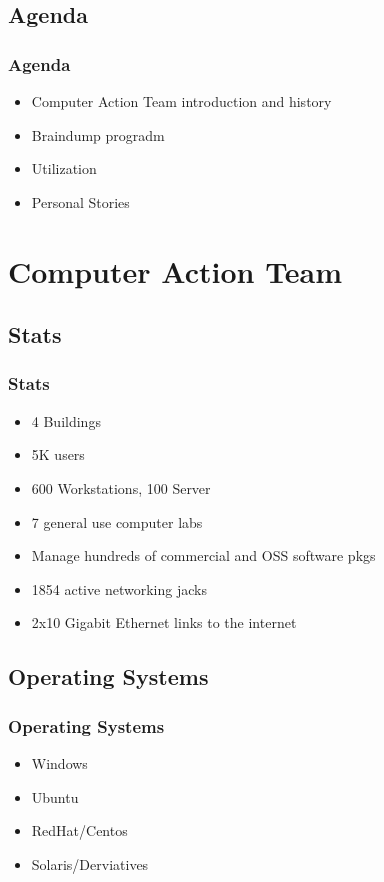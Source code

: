 \documentclass{beamer}
\begin{document}
\subsection{Agenda}
\frame
{
    \frametitle{Agenda}
    \begin{itemize}
        \item Computer Action Team introduction and history
        \item Braindump progradm
        \item Utilization
        \item Personal Stories
    \end{itemize}
}

\section{Computer Action Team}
\subsection{Stats}
\frame
{
    \frametitle{Stats}
    \begin{itemize}
        \item 4 Buildings
        \item 5K users
        \item 600 Workstations, 100 Server
        \item 7 general use computer labs
        \item Manage hundreds of commercial and OSS software pkgs
        \item 1854 active networking jacks
        \item 2x10 Gigabit Ethernet links to the internet
    \end{itemize}

}

\subsection{Operating Systems}
\frame
{
    \frametitle{Operating Systems}
    \begin{itemize}
        \item Windows
        \item Ubuntu
        \item RedHat/Centos
        \item Solaris/Derviatives
    \end{itemize}
}

\end{document}
